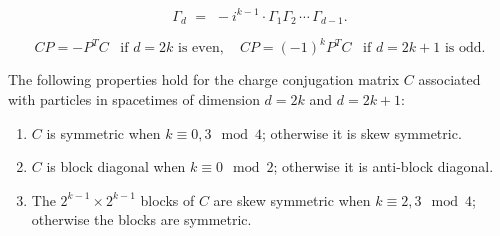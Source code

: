 \documentclass[10pt,a4paper]{amsart}
\begin{document}
\begin{equation}
\label{eq:Omega4}
    \Gamma_{d}\,\,=\,\,-i^{k-1} \cdot \Gamma_1 \Gamma_2 \,\cdots\, \Gamma_{d - 1}.
\end{equation}

\begin{equation}
\label{eq:Cproperties}
CP = -P^TC \,\,\, \text{ if $d=2k$ is even}, \quad CP = (-1)^kP^TC  \,\,\, \text{ if $d=2k+1$ is odd}.
\end{equation}

\begin{proposition} \label{prop:Cproperties}
    The following properties hold for the charge conjugation matrix $C$ associated with particles
    in spacetimes of dimension $d=2k$ and $d=2k+1$:
    \begin{enumerate}
        \item  $C$ is symmetric when $k \equiv 0,3 \!\! \mod{4}$; otherwise it is skew symmetric.
        \item $C$ is block diagonal when $k \equiv 0 \!\!\! \mod{2}$; otherwise it is anti-block diagonal.
        \item The $2^{k - 1} \times 2^{k - 1}$ blocks of $C$ are skew symmetric when $k \equiv 2,3 \!\! \mod{4}$; otherwise the blocks are symmetric.
    \end{enumerate}  
\end{proposition}
\end{document}
